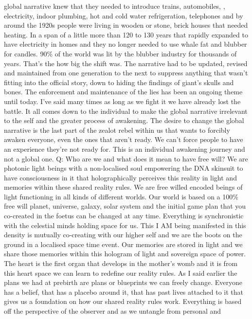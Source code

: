 global narrative knew that they needed to introduce trains, automobiles,
, electricity, indoor plumbing, hot and cold water refrigeration,
telephones and by around the 1920s people were living in wooden or
stone, brick houses that needed heating. In a span of a little more than
120 to 130 years that rapidly expanded to have electricity in homes and
they no longer needed to use whale fat and blubber for candles. 90\% of
the world was lit by the blubber industry for thousands of years. That's
the how big the shift was. The narrative had to be updated, revised and
maintained from one generation to the next to suppress anything that
wasn't fitting into the official story, down to hiding the findings of
giant's skulls and bones. The enforcement and maintenance of the lies
has been an ongoing theme until today. I've said many times as long as
we fight it we have already lost the battle. It all comes down to the
individual to make the global narrative irrelevant to the self and the
greater process of awakening. The desire to change the global narrative
is the last part of the zealot rebel within us that wants to forcibly
awaken everyone, even the ones that aren't ready. We can't force people
to have an experience they're not ready for. This is an individual
awakening journey and not a global one. Q: Who are we and what does it
mean to have free will? We are photonic light beings with a
non-localised soul empowering the DNA skinsuit to have consciousness in
it that holographically perceives this reality in light and memories
within these shared reality rules. We are free willed encoded beings of
light functioning in all kinds of different worlds. Our world is based
on a 100\% free will planet, universe, galaxy, solar system and the
initial game plan that you co-created in the foetus can be changed at
any time. Everything is synchronistic with the celestial minds holding
space for us. This I AM being manifested in this density is mutually
co-creating with our higher self and we are the boots on the ground in a
localised space time event. Our memories are stored in light and we
share those memories within this hologram of light and sovereign space
of power. The heart is the first organ that develops in the mother's
womb and it is from this heart space we can learn to redefine our
reality rules. As I said earlier the plans we had at prebirth are plans
or blueprints we can freely change. Everyone has a belief, that has a
placebo around it, that has past lives attached to it that gives us a
foundation on how our shared reality rules work. Everything is based off
the perspective of the observer and as we untangle from personal and
